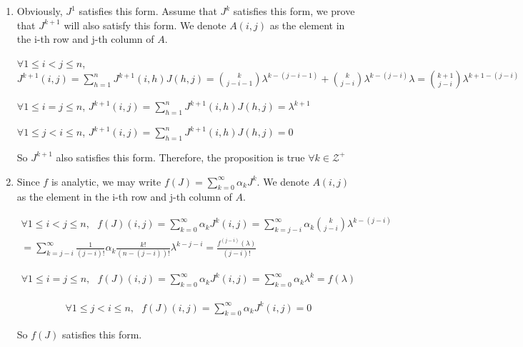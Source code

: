 \documentclass[11pt]{report}
\theoremstyle{definition}
\begin{document}
\begin{enumerate}[label = \alph*)]
\item
Obviously, $J^1$ satisfies this form. Assume that $J^k$ satisfies this form, we prove that $J^{k+1}$ will also satisfy this form. We denote $A(i,j)$ as the element in the i-th row and j-th column of $A$.

$\forall 1 \leq i < j \leq n$, $J^{k+1}(i,j) = \sum\limits_{h=1}^{n} J^{k+1}(i, h) J(h, j) = \binom{k}{j-i-1} \lambda^{k-(j-i-1)} + \binom{k}{j-i} \lambda^{k-(j-i)} \lambda = \binom{k+1}{j-i} \lambda^{k+1-(j-i)}$

$\forall 1 \leq i = j \leq n$, $J^{k+1}(i,j) = \sum\limits_{h=1}^{n} J^{k+1}(i, h) J(h, j) =  \lambda^{k+1}$

$\forall 1 \leq j < i \leq n$, $J^{k+1}(i,j) = \sum\limits_{h=1}^{n} J^{k+1}(i, h) J(h, j) = 0 $

So $J^{k+1}$ also satisfies this form. Therefore, the proposition is true $\forall k \in \mathcal{Z^+}$

\item
Since $f$ is analytic, we may write $f(J) = \sum\limits_{k = 0}^\infty \alpha_k J^k$. We denote $A(i,j)$ as the element in the i-th row and j-th column of $A$.

\begin{multline*}
  \forall 1 \leq i < j \leq n,~~~f(J)(i,j) = \sum\limits_{k=0}^{\infty} \alpha_k J^k(i, j) = \sum\limits_{k=j-i}^{\infty} \alpha_k \binom{k}{j-i} \lambda^{k-(j-i)} \\ = \sum\limits_{k=j-i}^{\infty}\frac{1}{(j-i)!} \alpha_k \frac{k!}{(n-(j-i))!} \lambda^{k-{j-i}} = \frac{f^{(j-i)}(\lambda)}{(j-i)!}
\end{multline*}

\begin{multline*}
  \forall 1 \leq i = j \leq n,~~~f(J)(i,j) = \sum\limits_{k=0}^{\infty} \alpha_k J^k(i, j) = \sum\limits_{k=0}^{\infty} \alpha_k \lambda^k = f(\lambda)
\end{multline*}

\begin{multline*}
  \forall 1 \leq j < i \leq n,~~~f(J)(i,j) = \sum\limits_{k=0}^{\infty} \alpha_k J^k(i, j) = 0
\end{multline*}

So $f(J)$ satisfies this form.

\end{enumerate}



\end{document}
